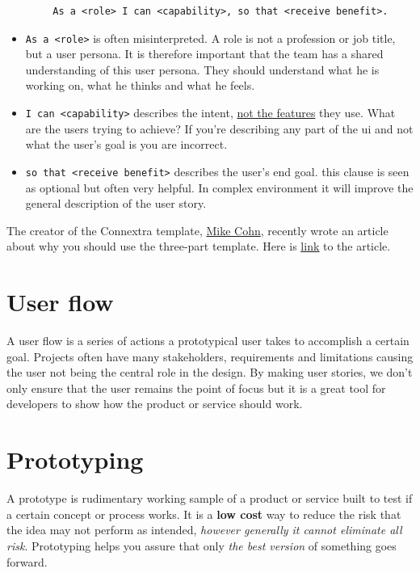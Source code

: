     \begin{verbatim}
        As a <role> I can <capability>, so that <receive benefit>.
    \end{verbatim}
    
    \begin{itemize}
        \item{\texttt{As a <role>} is often misinterpreted. A role is not a profession or job title, but a user persona. It is therefore important that the team has a shared understanding of this user persona. They should understand what he is working on, what he thinks and what he feels.}
        \item{\texttt{I can <capability>} describes the intent, \underline{not the features} they use. What are the users trying to achieve? If you're describing any part of the \gls{ui} and not what the user's goal is you are incorrect.}
        \item{\texttt{so that <receive benefit>} describes the user's end goal. this clause is seen as optional but often very helpful. In complex environment it will improve the general description of the user story.}
    \end{itemize}  
         
    The creator of the Connextra template, \href{https://en.wikipedia.org/wiki/Mike_Cohn/}{Mike Cohn}, recently wrote an article about why you should use the three-part template. Here is \href{https://www.mountaingoatsoftware.com/blog/why-the-three-part-user-story-template-works-so-well}{\underline{link}} to the article.
    
   \section{User flow}
    A user flow is a series of actions a prototypical user takes to accomplish a certain goal. 
    Projects often have many stakeholders, requirements and limitations causing the user not being the central role in the design. By making user stories, we don't only ensure that the user remains the point of focus but it is a great tool for developers to show how the product or service should work.
    
    \section{Prototyping}
    A prototype is rudimentary working sample of a product or service built to test if a certain concept or process works. It is a \textbf{low cost} way to reduce the risk that the idea may not perform as intended, \textit{however generally it cannot eliminate all risk}. Prototyping helps you assure that only \textit{the best version} of something goes forward.
    

